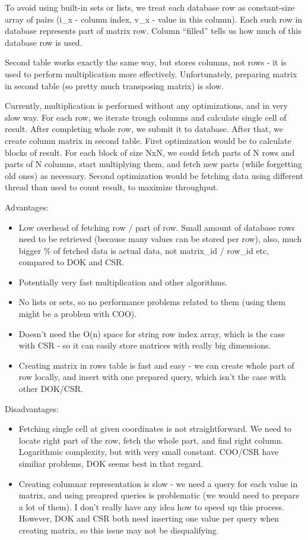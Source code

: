 \documentclass{article}
\begin{document}
To avoid using built-in sets or lists, we treat each database row as constant-size array of pairs (i\_x - column index, v\_x - value in this column). Each such row in database represents part of matrix row. Column ``filled'' tells us how much of this database row is used. 

Second table works exactly the same way, but stores columns, not rows - it is used to perform multiplication more effectively. Unfortunately, preparing matrix in second table (so pretty much transposing matrix) is slow.

Currently, multiplication is performed without any optimizations, and in very slow way. For each row, we iterate trough columns and calculate single cell of result. After completing whole row, we submit it to database. After that, we create column matrix in second table. First optimization would be to calculate blocks of result. For each block of size NxN, we could fetch parts of N rows and parts of N columns, start multiplying them, and fetch new parts (while forgetting old ones) as necessary. Second optimization would be fetching data using different thread than used to count result, to maximize throughput.

Advantages:
\begin{itemize}
 \item Low overhead of fetching row / part of row. Small amount of database rows need to be retrieved (because many values can be stored per row), also, much bigger \% of fetched data is actual data, not matrix\_id / row\_id etc, compared to DOK and CSR.
 \item Potentially very fast multiplication and other algorithms.
 \item No lists or sets, so no performance problems related to them (using them might be a problem with COO).
 \item Doesn't need the O(n) space for string row index array, which is the case with CSR - so it can easily store matrices with really big dimensions.
 \item Creating matrix in rows table is fast and easy - we can create whole part of row locally, and insert with one prepared query, which isn't the case with other DOK/CSR.
\end{itemize}

Disadvantages:
\begin{itemize}
 \item Fetching single cell at given coordinates is not straightforward. We need to locate right part of the row, fetch the whole part, and find right column. Logarithmic complexity, but with very small constant. COO/CSR have similiar problems, DOK seems best in that regard.
 \item Creating columnar representation is slow - we need a query for each value in matrix, and using preapred queries is problematic (we would need to prepare a lot of them). I don't really have any idea how to speed up this process. However, DOK and CSR both need inserting one value per query when creating matrix, so this issue may not be disqualifying.
\end{itemize}
\end{document}
